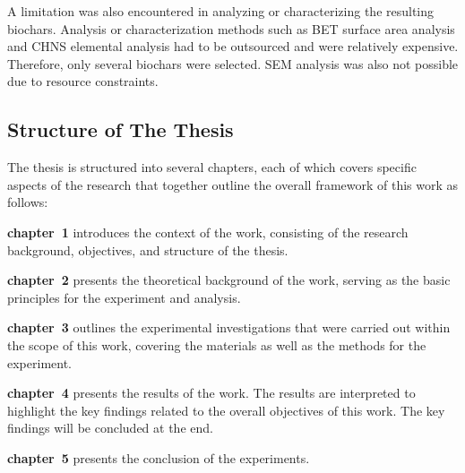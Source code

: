 \vspace{0.8em}

A limitation was also encountered in analyzing or characterizing the resulting biochars. Analysis or characterization methods such as BET surface area analysis and CHNS elemental analysis had to be outsourced and were relatively expensive. Therefore, only several biochars were selected. SEM analysis was also not possible due to resource constraints.
\subsection{Structure of The Thesis}

The thesis is structured into several chapters, each of which covers specific aspects of the research that together outline the overall framework of this work as follows:

\vspace{0.8em}

\textbf{chapter~1} introduces the context of the work, consisting of the research background, objectives, and structure of the thesis.

\vspace{0.8em}

\textbf{chapter~2} presents the theoretical background of the work, serving as the basic principles for the experiment and analysis. 

\vspace{0.8em}

\textbf{chapter~3} outlines the experimental investigations that were carried out within the scope of this work, covering the materials as well as the methods for the experiment.

\vspace{0.8em}

\textbf{chapter~4} presents the results of the work. The results are interpreted to highlight the key findings related to the overall objectives of this work. The key findings will be concluded at the end.

\vspace{0.8em}

\textbf{chapter~5} presents the conclusion of the experiments.
